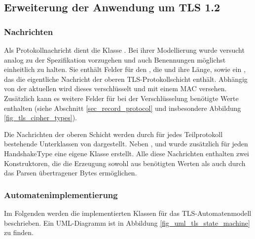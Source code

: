 \subsection{Erweiterung der Anwendung um TLS 1.2}


\subsubsection{Nachrichten}
Als Protokollnachricht dient die Klasse . Bei ihrer Modellierung wurde versucht analog zu der Spezifikation vorzugehen und auch Benennungen möglichst einheitlich zu halten. Sie enthält Felder für den , die  und ihre Länge, sowie ein , das die eigentliche Nachricht der oberen TLS-Protokollschicht enthält.
Abhängig von der aktuellen \ciphersuite{} wird dieses  verschlüsselt und mit einem MAC versehen. Zusätzlich kann es weitere Felder für bei der Verschlüsselung benötigte Werte enthalten (siehe Abschnitt \ref{sec_record_protocol} und insbesondere Abbildung \ref{fig_tls_cipher_types}). 

Die Nachrichten der oberen Schicht werden durch für jedes Teilprotokoll bestehende Unterklassen von  dargestellt. Neben ,  und  wurde zusätzlich für jeden HandshakeType eine eigene Klasse erstellt. Alle diese Nachrichten enthalten zwei Konstruktoren, die die Erzeugung sowohl aus benötigten Werten als auch durch das Parsen übertragener Bytes ermöglichen. 

\subsubsection{Automatenimplementierung}
Im Folgenden werden die implementierten Klassen für das TLS-Automatenmodell beschrieben. Ein UML-Diagramm ist in Abbildung \ref{fig_uml_tls_state_machine} zu finden.

